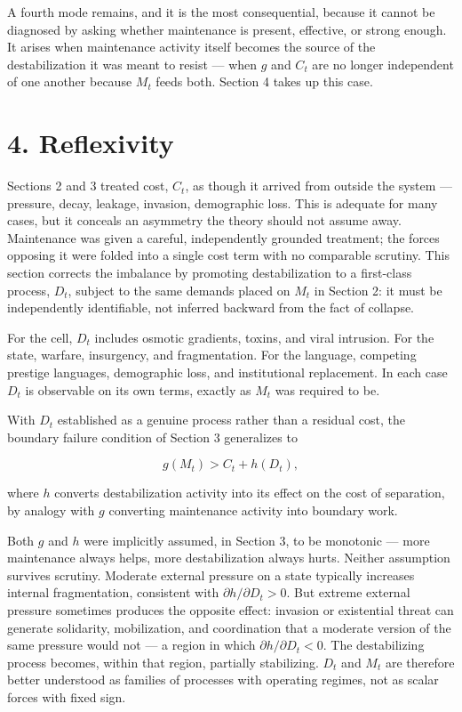 \documentclass[11pt]{article}
\theoremstyle{plain}
\begin{document}
A fourth mode remains, and it is the most consequential, because it cannot be diagnosed by asking whether maintenance is present, effective, or strong enough. It arises when maintenance activity itself becomes the source of the destabilization it was meant to resist --- when \(g\) and \(C_t\) are no longer independent of one another because \(M_t\) feeds both. Section 4 takes up this case.

\section*{4. Reflexivity}

Sections 2 and 3 treated cost, \(C_t\), as though it arrived from outside the system --- pressure, decay, leakage, invasion, demographic loss. This is adequate for many cases, but it conceals an asymmetry the theory should not assume away. Maintenance was given a careful, independently grounded treatment; the forces opposing it were folded into a single cost term with no comparable scrutiny. This section corrects the imbalance by promoting destabilization to a first-class process, \(D_t\), subject to the same demands placed on \(M_t\) in Section 2: it must be independently identifiable, not inferred backward from the fact of collapse.

For the cell, \(D_t\) includes osmotic gradients, toxins, and viral intrusion. For the state, warfare, insurgency, and fragmentation. For the language, competing prestige languages, demographic loss, and institutional replacement. In each case \(D_t\) is observable on its own terms, exactly as \(M_t\) was required to be.

With \(D_t\) established as a genuine process rather than a residual cost, the boundary failure condition of Section 3 generalizes to

\[g(M_t) > C_t + h(D_t),\]

where \(h\) converts destabilization activity into its effect on the cost of separation, by analogy with \(g\) converting maintenance activity into boundary work.

Both \(g\) and \(h\) were implicitly assumed, in Section 3, to be monotonic --- more maintenance always helps, more destabilization always hurts. Neither assumption survives scrutiny. Moderate external pressure on a state typically increases internal fragmentation, consistent with \(\partial h/\partial D_t > 0\). But extreme external pressure sometimes produces the opposite effect: invasion or existential threat can generate solidarity, mobilization, and coordination that a moderate version of the same pressure would not --- a region in which \(\partial h/\partial D_t < 0\). The destabilizing process becomes, within that region, partially stabilizing. \(D_t\) and \(M_t\) are therefore better understood as families of processes with operating regimes, not as scalar forces with fixed sign.
\end{document}
